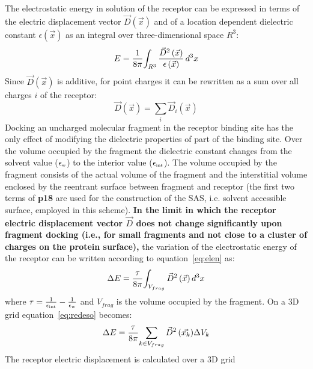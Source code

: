 \documentclass[a4paper,12pt,titlepage]{article}
\begin{document}
The electrostatic energy in 
solution of the receptor can be expressed in terms of the 
electric displacement vector $\vec{D}\left(\vec{x}\right)$ and of a 
location dependent dielectric constant $\epsilon\left(\vec{x}\right)$ 
as an integral over three-dimensional space $R^3$:
%
\begin{equation}
%
E = {1\over {8\pi}} {\int_{R^{3}} {{\vec{D}^{2}\left(\vec{x}\right)}
\over {\epsilon\left(\vec{x}\right)}} \,d^{3}x}  
\label{eq:elen} 
%
\end{equation}
%
Since $\vec{D}\left(\vec{x}\right)$ is additive, for point charges it 
can be rewritten as a sum over all charges $i$ of the receptor: 
%
\begin{equation}
%
\vec{D}\left(\vec{x}\right) = 
\sum_{i} \vec{D}_{i}\left(\vec{x}\right) 
%
\end{equation}
%
Docking an uncharged molecular fragment in the receptor binding site 
has the only effect of modifying the 
dielectric properties of part of the binding site. Over the volume 
occupied by the fragment the dielectric constant changes from the 
solvent value ($\epsilon_{\mbox{\tiny w}}$) to the interior value 
($\epsilon_{\mbox{\tiny int}}$). 
The volume occupied by the fragment consists of the actual volume of the 
fragment and the interstitial volume enclosed by the reentrant surface between 
fragment and receptor (the first two terms of {\bf p18} are used for the 
construction of the SAS, i.e. solvent accessible surface, employed in this scheme). 
{\bf
In the limit in which the receptor electric displacement vector $\vec{D}$ 
does not change significantly upon fragment docking (i.e., for small fragments
and not close to a cluster of charges on the protein surface),} the variation of 
the electrostatic energy of the receptor can be written according to 
equation~\ref{eq:elen} as:
%
\begin{equation}
%
\Delta E = {\tau \over {8\pi} } {\int_{V_{frag}} 
{{\vec{D}^{2}\left(\vec{x}\right)}} \,d^{3}x}  
\label{eq:redeso} 
%
\end{equation}
%
where $\tau=\frac{1}{\epsilon_{\mbox{\tiny int}}} - \frac{1}{\epsilon_{\mbox{\tiny w}}}$ and $V_{frag}$ 
is the volume occupied by the fragment.
On a 3D grid equation~\ref{eq:redeso} becomes:
%
\begin{equation}
%
\Delta E = {\tau \over {8\pi} } {\sum_{k\in V_{frag}} 
{{\vec{D}^{2}\left(\vec{x_k}\right)}} \Delta V_k}  
\label{eq:redesogr} 
%
\end{equation}
%
The receptor electric displacement is calculated over a 3D grid 
\end{document}
